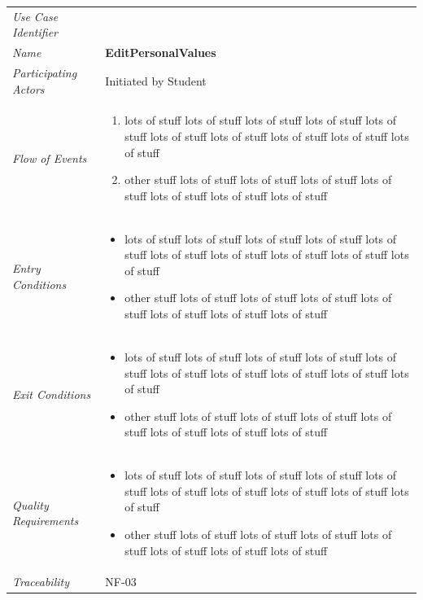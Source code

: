 \documentclass[12pt,letterpaper]{article}
\begin{document}
\begin{center}
	\begin{tabu} to 
		\toprule
		Use Case Identifier & \editpersonalvalues{} \\
		Name & {\bf EditPersonalValues} \\
		Participating Actors & Initiated by Student \\
		Flow of Events & 
	    \begin{enumerate}[topsep=-1em]
		    \item lots of stuff lots of stuff lots of stuff lots of stuff lots of stuff lots of stuff lots of stuff lots of stuff lots of stuff lots of stuff
		    \item other stuff lots of stuff lots of stuff lots of stuff lots of stuff lots of stuff lots of stuff lots of stuff
		\end{enumerate} \\

		Entry Conditions &
		\begin{itemize}[topsep=-1em]
		    \item lots of stuff lots of stuff lots of stuff lots of stuff lots of stuff lots of stuff lots of stuff lots of stuff lots of stuff lots of stuff
		    \item other stuff lots of stuff lots of stuff lots of stuff lots of stuff lots of stuff lots of stuff lots of stuff
        \end{itemize} \\

		Exit Conditions &
		\begin{itemize}[topsep=-1em]
		    \item lots of stuff lots of stuff lots of stuff lots of stuff lots of stuff lots of stuff lots of stuff lots of stuff lots of stuff lots of stuff
		    \item other stuff lots of stuff lots of stuff lots of stuff lots of stuff lots of stuff lots of stuff lots of stuff
        \end{itemize} \\

		Quality Requirements &
		\begin{itemize}[topsep=-1em]
		    \item lots of stuff lots of stuff lots of stuff lots of stuff lots of stuff lots of stuff lots of stuff lots of stuff lots of stuff lots of stuff
		    \item other stuff lots of stuff lots of stuff lots of stuff lots of stuff lots of stuff lots of stuff lots of stuff
        \end{itemize} \\

		Traceability & NF-03 \\
		\toprule
	\end{tabu}
\end{center}
\end{document}
